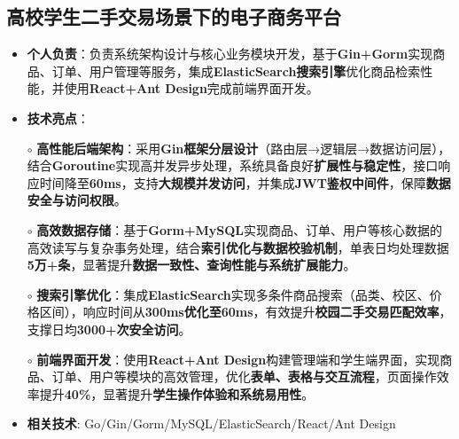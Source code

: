 \subsection{\textbf{高校学生二手交易场景下的电子商务平台} \hspace{2cm}{2024.10 -- 2024.12}}
  \begin{normalsize}
    \begin{itemize}
  \item \textbf{个人负责}：负责系统架构设计与核心业务模块开发，基于\textbf{Gin+Gorm}实现商品、订单、用户管理等服务，集成\textbf{ElasticSearch搜索引擎}优化商品检索性能，并使用\textbf{React+Ant Design}完成前端界面开发。
  \item \textbf{技术亮点}：
    \setlength{\itemindent}{1em} %
  \item[$\circ$] \textbf{高性能后端架构}：采用\textbf{Gin框架分层设计}（路由层→逻辑层→数据访问层），结合\textbf{Goroutine}实现高并发异步处理，系统具备良好\textbf{扩展性与稳定性}，接口响应时间降至\textbf{60ms}，支持\textbf{大规模并发访问}，并集成\textbf{JWT鉴权中间件}，保障\textbf{数据安全与访问权限}。
  \item[$\circ$] \textbf{高效数据存储}：基于\textbf{Gorm+MySQL}实现商品、订单、用户等核心数据的高效读写与复杂事务处理，结合\textbf{索引优化与数据校验机制}，单表日均处理数据\textbf{5万+条}，显著提升\textbf{数据一致性、查询性能与系统扩展能力}。
  \item[$\circ$] \textbf{搜索引擎优化}：集成\textbf{ElasticSearch}实现多条件商品搜索（品类、校区、价格区间），响应时间从\textbf{300ms优化至60ms}，有效提升\textbf{校园二手交易匹配效率}，支撑日均\textbf{3000+次安全访问}。
  \item[$\circ$] \textbf{前端界面开发}：使用\textbf{React+Ant Design}构建管理端和学生端界面，实现商品、订单、用户等模块的高效管理，优化\textbf{表单、表格与交互流程}，页面操作效率提升\textbf{40\%}，显著提升\textbf{学生操作体验和系统易用性}。
    \setlength{\itemindent}{0em} %
    \item \textbf{相关技术}: Go/Gin/Gorm/MySQL/ElasticSearch/React/Ant Design
    \end{itemize}
  \end{normalsize}
